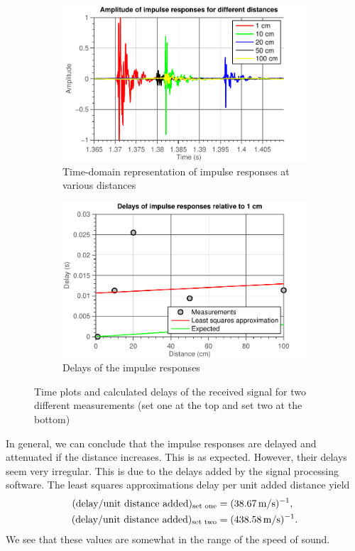 \documentclass[11pt,titlepage]{report}
\begin{document}
\begin{figure}[H]
\begin{subfigure}{0.49\textwidth}
		\includegraphics[width=\textwidth]{../../deliverable-7-resources/figures/ass-1/report-11-12-13/ass-1-report-13-time-set-2.pdf}
		\caption{\centering Time-domain representation of impulse responses at various distances}
	\end{subfigure}
	\begin{subfigure}{0.49\textwidth}
		\includegraphics[width=\textwidth]{../../deliverable-7-resources/figures/ass-1/report-11-12-13/ass-1-report-13-delays-set-2.pdf}
		\caption{Delays of the impulse responses}
	\end{subfigure}
	\caption{Time plots and calculated delays of the received signal for two different measurements (set one at the top and set two at the bottom)}
	\label{fig:ass-1-rep-12}
\end{figure}

In general, we can conclude that the impulse responses are delayed and attenuated if the distance increases. This is as expected. However, their delays seem very irregular. This is due to the delays added by the signal processing software. The least squares approximations delay per unit added distance yield
\begin{align*}
	(\text{delay/unit distance added})_{\text{set one}} &= (\text{\SI{38.67}{m/s}})^{-1}, \\
	(\text{delay/unit distance added})_{\text{set two}} &= (\text{\SI{438.58}{m/s}})^{-1}.
\end{align*}
We see that these values are somewhat in the range of the speed of sound.
\end{document}
